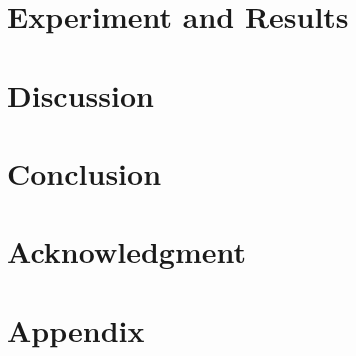 \documentclass[conference,onecolumn]{IEEEtran}
\begin{document}
\section{Experiment and Results}

\section{Discussion}


\section{Conclusion}
\section*{Acknowledgment}

\newpage
\section*{Appendix}

 
\newpage


\end{document}
